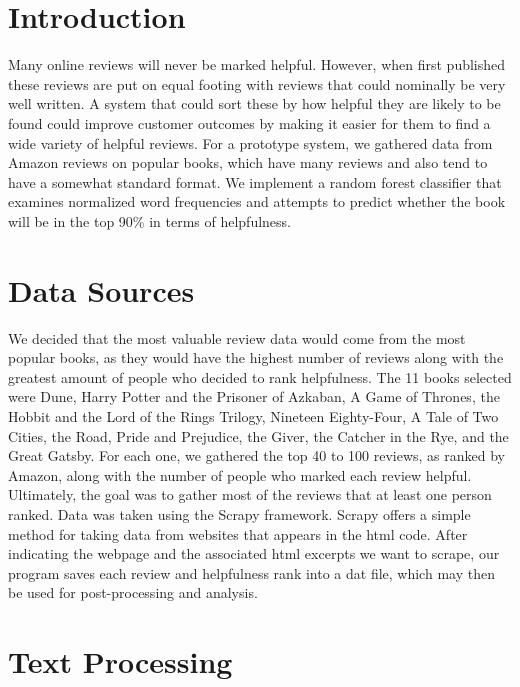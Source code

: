 \documentclass{article}
\begin{document}
\begin{multicols}{2}
\section{Introduction}
	Many online reviews will never be marked helpful. However, when first published these reviews are put on equal footing with reviews that could nominally be very well written. A system that could sort these by how helpful they are likely to be found could improve customer outcomes by making it easier for them to find a wide variety of helpful reviews. For a prototype system, we gathered data from Amazon reviews on popular books, which have many reviews and also tend to have a somewhat standard format. We implement a random forest classifier that examines normalized word frequencies and attempts to predict whether the book will be in the top 90\% in terms of helpfulness. 

\section{Data Sources}

We decided that the most valuable review data would come from the most popular books, as they would have the highest number of reviews along with the greatest amount of people who decided to rank helpfulness. The 11 books selected were Dune, Harry Potter and the Prisoner of Azkaban, A Game of Thrones, the Hobbit and the Lord of the Rings Trilogy, Nineteen Eighty-Four, A Tale of Two Cities, the Road, Pride and Prejudice, the Giver, the Catcher in the Rye, and the Great Gatsby. For each one, we gathered the top 40 to 100 reviews, as ranked by Amazon, along with the number of people who marked each review helpful. Ultimately, the goal was to gather most of the reviews that at least one person ranked. Data was taken using the Scrapy framework.\cite{scrapy} Scrapy offers a simple method for taking data from websites that appears in the html code. After indicating the webpage and the associated html excerpts we want to scrape, our program saves each review and helpfulness rank into a dat file, which may then be used for post-processing and analysis.


\section{Text Processing}


\end{multicols}
\end{document}
